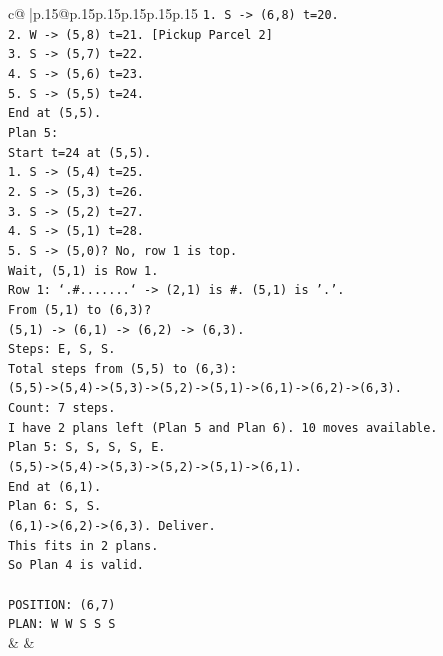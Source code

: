 \documentclass{article}
\begin{document}
{\begin{supertabular}{c@{$\;$}|p{.15\linewidth}@{}p{.15\linewidth}p{.15\linewidth}p{.15\linewidth}p{.15\linewidth}p{.15\linewidth}}
{{{\texttt{1. S {-}> (6,8) t=20.} \\
\texttt{2. W {-}> (5,8) t=21. {[}Pickup Parcel 2{]}} \\
\texttt{3. S {-}> (5,7) t=22.} \\
\texttt{4. S {-}> (5,6) t=23.} \\
\texttt{5. S {-}> (5,5) t=24.} \\
\texttt{End at (5,5).} \\
\texttt{Plan 5:} \\
\texttt{Start t=24 at (5,5).} \\
\texttt{1. S {-}> (5,4) t=25.} \\
\texttt{2. S {-}> (5,3) t=26.} \\
\texttt{3. S {-}> (5,2) t=27.} \\
\texttt{4. S {-}> (5,1) t=28.} \\
\texttt{5. S {-}> (5,0)? No, row 1 is top.} \\
\texttt{Wait, (5,1) is Row 1.} \\
\texttt{Row 1: `.\#.......` {-}> (2,1) is \#. (5,1) is '.'.} \\
\texttt{From (5,1) to (6,3)?} \\
\texttt{(5,1) {-}> (6,1) {-}> (6,2) {-}> (6,3).} \\
\texttt{Steps: E, S, S.} \\
\texttt{Total steps from (5,5) to (6,3):} \\
\texttt{(5,5){-}>(5,4){-}>(5,3){-}>(5,2){-}>(5,1){-}>(6,1){-}>(6,2){-}>(6,3).} \\
\texttt{Count: 7 steps.} \\
\texttt{I have 2 plans left (Plan 5 and Plan 6). 10 moves available.} \\
\texttt{Plan 5: S, S, S, S, E.} \\
\texttt{(5,5){-}>(5,4){-}>(5,3){-}>(5,2){-}>(5,1){-}>(6,1).} \\
\texttt{End at (6,1).} \\
\texttt{Plan 6: S, S.} \\
\texttt{(6,1){-}>(6,2){-}>(6,3). Deliver.} \\
\texttt{This fits in 2 plans.} \\
\texttt{So Plan 4 is valid.} \\
\\ 
\texttt{POSITION: (6,7)} \\
\texttt{PLAN: W W S S S} \\
            }
        }
    }
    & & \\ \\


\end{supertabular}}
\end{document}
